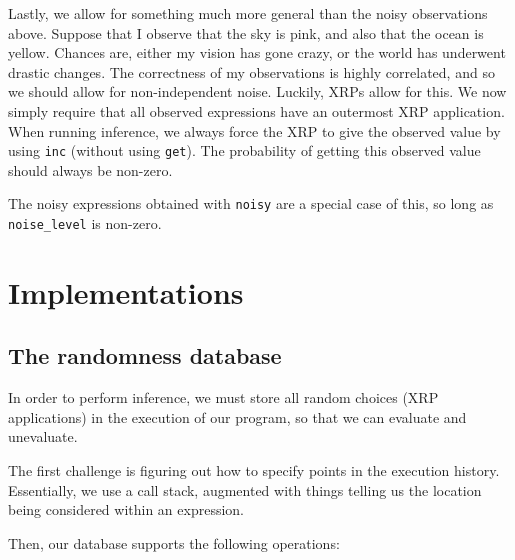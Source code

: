 \documentclass[11pt]{article}
\begin{document}
Lastly, we allow for something much more general than the noisy observations above.  Suppose that I observe that the sky is pink, and also that the ocean is yellow.  Chances are, either my vision has gone crazy, or the world has underwent drastic changes.  The correctness of my observations is highly correlated, and so we should allow for non-independent noise.  Luckily, XRPs allow for this.  We now simply require that all observed expressions have an outermost XRP application.  When running inference, we always force the XRP to give the observed value by using {\tt inc} (without using {\tt get}).  The probability of getting this observed value should always be non-zero.  

The noisy expressions obtained with {\tt noisy} are a special case of this, so long as {\tt noise\_level} is non-zero.  

\section{Implementations}

\subsection{The randomness database}

In order to perform inference, we must store all random choices (XRP applications) in the execution of our program, so that we can evaluate and unevaluate.  

The first challenge is figuring out how to specify points in the execution history.  Essentially, we use a call stack, augmented with things telling us the location being considered within an expression.  

Then, our database supports the following operations:
\end{document}
